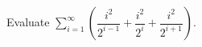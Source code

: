 Evaluate $\displaystyle\sum_{i=1}^{\infty}\left(\dfrac{i^2}{2^{i-1}}+\dfrac{i^2}{2^i}+\dfrac{i^2}{2^{i+1}}\right)$.
